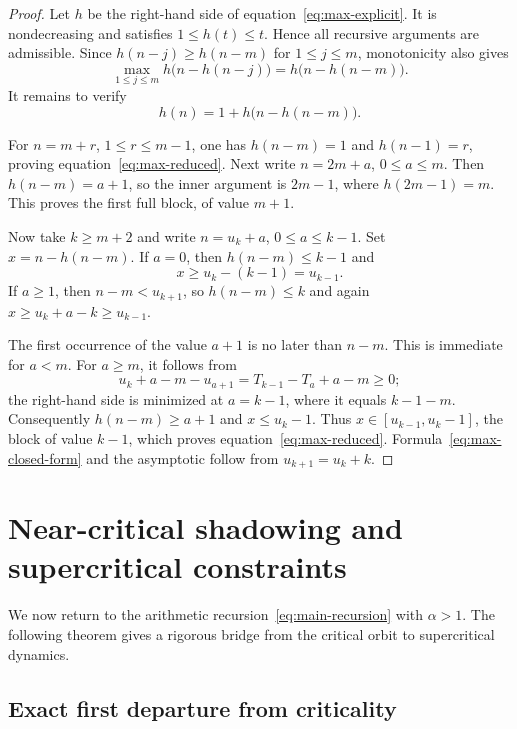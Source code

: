 \documentclass[11pt]{article}
\theoremstyle{definition}
\theoremstyle{remark}
\begin{document}
\begin{proof}
Let $h$ be the right-hand side of equation~\eqref{eq:max-explicit}.  It is
nondecreasing and satisfies $1\le h(t)\le t$.  Hence all recursive arguments
are admissible.  Since $h(n-j)\ge h(n-m)$ for $1\le j\le m$, monotonicity
also gives
\[
\max_{1\le j\le m}h\bigl(n-h(n-j)\bigr)
=h\bigl(n-h(n-m)\bigr).
\]
It remains to verify
\begin{equation}\label{eq:max-reduced}
h(n)=1+h\bigl(n-h(n-m)\bigr).
\end{equation}

For $n=m+r$, $1\le r\le m-1$, one has $h(n-m)=1$ and
$h(n-1)=r$, proving equation~\eqref{eq:max-reduced}.  Next write
$n=2m+a$, $0\le a\le m$.  Then $h(n-m)=a+1$, so the inner argument is
$2m-1$, where $h(2m-1)=m$.  This proves the first full block, of value
$m+1$.

Now take $k\ge m+2$ and write $n=u_k+a$, $0\le a\le k-1$.  Set
$x=n-h(n-m)$.  If $a=0$, then $h(n-m)\le k-1$ and
\[
x\ge u_k-(k-1)=u_{k-1}.
\]
If $a\ge1$, then $n-m<u_{k+1}$, so $h(n-m)\le k$ and again
$x\ge u_k+a-k\ge u_{k-1}$.

The first occurrence of the value $a+1$ is no later than $n-m$.  This is
immediate for $a<m$.  For $a\ge m$, it follows from
\[
u_k+a-m-u_{a+1}
=T_{k-1}-T_a+a-m\ge0;
\]
the right-hand side is minimized at $a=k-1$, where it equals $k-1-m$.
Consequently $h(n-m)\ge a+1$ and $x\le u_k-1$.  Thus
$x\in[u_{k-1},u_k-1]$, the block of value $k-1$, which proves
equation~\eqref{eq:max-reduced}.  Formula~\eqref{eq:max-closed-form} and the
asymptotic follow from $u_{k+1}=u_k+k$.
\end{proof}

\section{Near-critical shadowing and supercritical constraints}\label{sec:super}

We now return to the arithmetic recursion~\eqref{eq:main-recursion} with
$\alpha>1$.  The following theorem gives a rigorous bridge from the critical
orbit to supercritical dynamics.

\subsection{Exact first departure from criticality}
\end{document}
